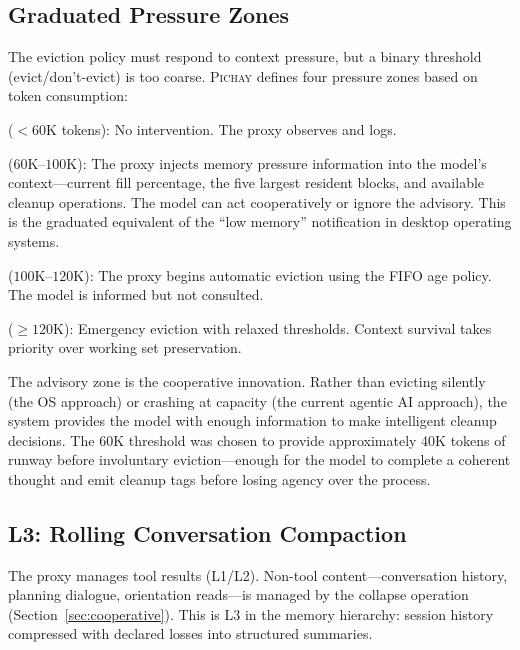 \subsection{Graduated Pressure Zones}
\label{sec:pressure}

The eviction policy must respond to context pressure, but a binary
threshold (evict/don't-evict) is too coarse. \textsc{Pichay} defines
four pressure zones based on token consumption:

\begin{description}[nosep]
  \item[Normal] ($< 60\text{K}$ tokens): No intervention. The proxy
    observes and logs.
  \item[Advisory] ($60\text{K}$--$100\text{K}$): The proxy injects
    memory pressure information into the model's context---current
    fill percentage, the five largest resident blocks, and available
    cleanup operations. The model can act cooperatively or ignore the
    advisory. This is the graduated equivalent of the ``low memory''
    notification in desktop operating systems.
  \item[Involuntary] ($100\text{K}$--$120\text{K}$): The proxy begins
    automatic eviction using the FIFO age policy. The model is
    informed but not consulted.
  \item[Aggressive] ($\geq 120\text{K}$): Emergency eviction with
    relaxed thresholds. Context survival takes priority over working
    set preservation.
\end{description}

The advisory zone is the cooperative innovation. Rather than
evicting silently (the OS approach) or crashing at capacity (the
current agentic AI approach), the system provides the model with
enough information to make intelligent cleanup decisions. The
60K threshold was chosen to provide approximately 40K tokens of
runway before involuntary eviction---enough for the model to
complete a coherent thought and emit cleanup tags before losing
agency over the process.

\subsection{L3: Rolling Conversation Compaction}
\label{sec:l3}

The proxy manages tool results (L1/L2). Non-tool content---conversation
history, planning dialogue, orientation reads---is managed by the
collapse operation (Section~\ref{sec:cooperative}). This is L3 in the
memory hierarchy: session history compressed with declared losses into
structured summaries.

